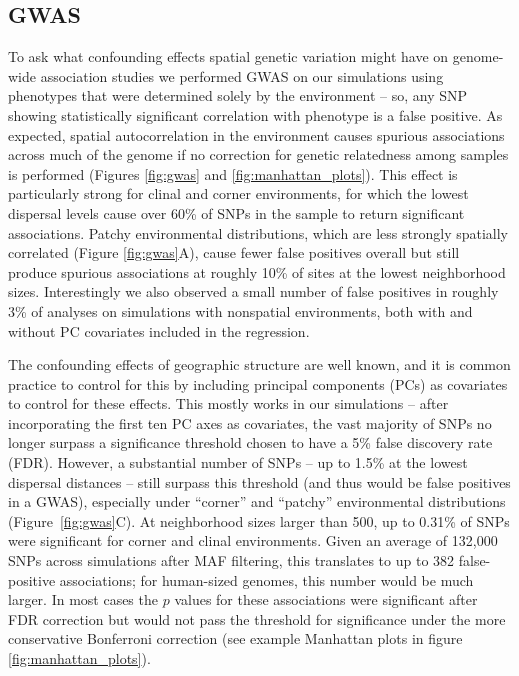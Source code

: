 \documentclass[10pt,twoside,lineno,hidelinks]{preprint}
\begin{document}
\subsection{GWAS}

To ask what confounding effects spatial genetic variation might have on genome-wide association studies we performed GWAS on our simulations using phenotypes that were determined solely by the environment
-- so, any SNP showing statistically significant correlation with phenotype is a false positive. 
As expected, spatial autocorrelation in the environment causes spurious associations 
across much of the genome if no correction for genetic relatedness among samples is performed (Figures \ref{fig:gwas} and \ref{fig:manhattan_plots}). 
This effect is particularly strong for clinal and corner environments, 
for which the lowest dispersal levels cause over 60\% of SNPs in the sample to return significant associations. 
Patchy environmental distributions, which are less strongly spatially correlated (Figure \ref{fig:gwas}A), 
cause fewer false positives overall but still produce spurious associations at roughly 10\% of sites at the lowest neighborhood sizes. 
Interestingly we also observed a small number of false positives in roughly 3\% of analyses on simulations with nonspatial environments, both with and without PC covariates included in the regression.

The confounding effects of geographic structure are well known, 
and it is common practice to control for this by including principal components (PCs) as covariates to control for these effects.
This mostly works in our simulations -- after incorporating the first ten PC axes as covariates, the vast majority of SNPs no longer surpass a significance threshold chosen to have a 5\% false discovery rate (FDR).
However, a substantial number of SNPs -- up to 1.5\% at the lowest dispersal distances -- still surpass this threshold (and thus would be false positives in a GWAS),
especially under ``corner'' and ``patchy'' environmental distributions (Figure~\ref{fig:gwas}C). 
At neighborhood sizes larger than 500, up to 0.31\% of SNPs were significant for corner and clinal environments. 
Given an average of 132,000 SNPs across simulations after MAF filtering, this translates to up to 382 false-positive associations; for human-sized genomes, this number would be much larger.
In most cases the $p$ values for these associations were significant after FDR correction but would not pass the threshold for significance under the more conservative Bonferroni correction (see example Manhattan plots in figure \ref{fig:manhattan_plots}).
\end{document}
